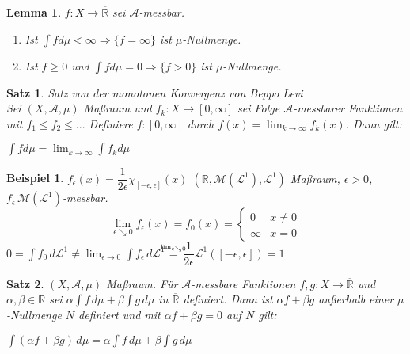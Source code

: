 \documentclass[11pt]{memoir}
\theoremstyle{changebreak}
\newtheorem{Beispiel}{Beispiel}[chapter]
\newtheorem{Lemma}{Lemma}[chapter]
\newtheorem{Satz}{Satz}[chapter]
\newcommand\overequal[1]{\mathrel{\overset{\makebox[0pt]{\mbox{\normalfont\tiny\sffamily $ #1 $}}}{=}}}
\begin{document}
\begin{Lemma}
$f: X \rightarrow \overline{\mathbb R}$ sei $\mathscr A$-messbar.
\begin{enumerate}
	\item Ist $\int f d\mu < \infty \Rightarrow \{f = \infty\}$ ist $\mu$-Nullmenge.
	\item Ist $f \geq 0$ und $\int f d\mu = 0 \Rightarrow \{f > 0\}$ ist $\mu$-Nullmenge.
\end{enumerate}
\end{Lemma}




\begin{Satz}
\emph{Satz von der monotonen Konvergenz von Beppo Levi} \\
Sei $(X, \mathscr A, \mu)$ Maßraum und $f_k: X \rightarrow [0, \infty]$ sei Folge $\mathscr A$-messbarer Funktionen mit $f_1 \leq f_2 \leq ...$ Definiere $f: [0, \infty]$ durch $f(x) = \lim_{k \rightarrow \infty} f_k (x)$. Dann gilt:
\begin{center}
	$\int f d\mu = \lim_{k\rightarrow \infty} \int f_k d\mu$
\end{center}
\end{Satz}


\begin{Beispiel}
$f_{\epsilon} (x) = \dfrac{1}{2\epsilon} \chi_{[-\epsilon, \epsilon]}(x)$
$(\mathbb R, \mathscr M(\mathscr L^1), \mathscr L^1)$ Maßraum, $\epsilon > 0$, $f_\epsilon \, \mathscr M(\mathscr L^1)$-messbar.
\begin{equation}
	\lim_{\epsilon \searrow 0} f_\epsilon (x) = f_0 (x) =
	\begin{cases}
		0 & x \ne 0 \\
		\infty & x = 0
	\end{cases}
\end{equation}
$0 = \int f_0 \, d\mathscr L^1 \ne \lim_{\epsilon \rightarrow 0} \int f_\epsilon \, d\mathscr L^1$ $\overequal{\lim_{\epsilon \searrow 0}}$ $\dfrac{1}{2\epsilon} \mathscr L^1([-\epsilon, \epsilon]) =1$
\end{Beispiel}


\begin{Satz}
$(X, \mathscr A, \mu)$ Maßraum. Für $\mathscr A$-messbare Funktionen $f, g: X \rightarrow \overline{\mathbb R} $ und $\alpha, \beta \in \mathbb R$ sei $\alpha\int f \, d\mu + \beta \int g \, d\mu$ in $\overline{\mathbb R}$ definiert. Dann ist $\alpha f + \beta g$ außerhalb einer $\mu$-Nullmenge $N$ definiert und mit $\alpha f + \beta g = 0$ auf $N$ gilt: \\
\begin{center}
	$\int (\alpha f + \beta g) \, d\mu = \alpha \int f \, d\mu + \beta \int g \, d\mu$
\end{center}
\end{Satz}
\end{document}
